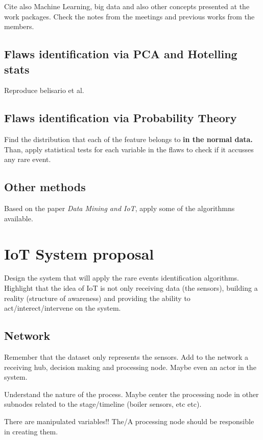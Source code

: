 \documentclass[a4paper, 12pt]{article}
\begin{document}
Cite also Machine Learning, big data and also other concepts presented at the work packages. Check the notes from the meetings and previous works from the members.


\subsection{Flaws identification via PCA and Hotelling stats}

Reproduce belisario et al.

\subsection{Flaws identification via Probability Theory}

Find the distribution that each of the feature belongs to \textbf{in the normal data.} Than, apply statistical tests for each variable in the flaws to check if it accusses any rare event.

\subsection{Other methods}
Based on the paper \textit{Data Mining and IoT}, apply some of the algorithmns available.

\section{IoT System proposal}

Design the system that will apply the rare events identification algorithms. Highlight that the idea of IoT is not only receiving data (the sensors), building a reality (structure of awareness) and providing the ability to act/interect/intervene on the system.

\subsection{Network}

Remember that the dataset only represents the sensors. Add to the network a receiving hub, decision making and processing node. Maybe even an actor in the system.

Understand the nature of the process. Maybe center the processing node in other subnodes related to the stage/timeline (boiler sensors, etc etc).

There are manipulated variables!! The/A processing node should be responsible in creating them.
\end{document}
